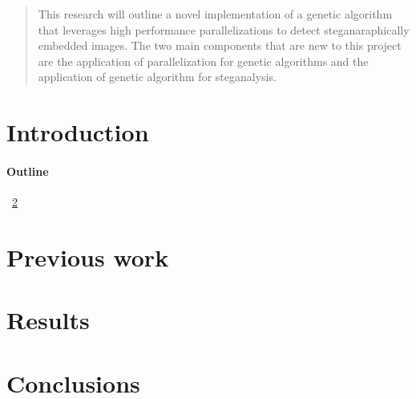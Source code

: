 \documentclass[12pt]{article}
\begin{document}
\maketitle

\begin{abstract}
\quad This research will outline a novel implementation of a genetic algorithm that leverages high performance parallelizations to detect 
steganaraphically embedded images. The two main components that are new to this project are the application of parallelization for genetic algorithms and the application of genetic algorithm for steganalysis.
\end{abstract}

\section{Introduction}

\paragraph{Outline}
~\ref{previous work}

\section{Previous work}\label{previous work}


\section{Results}\label{results}


\section{Conclusions}\label{conclusions}




\end{document}
